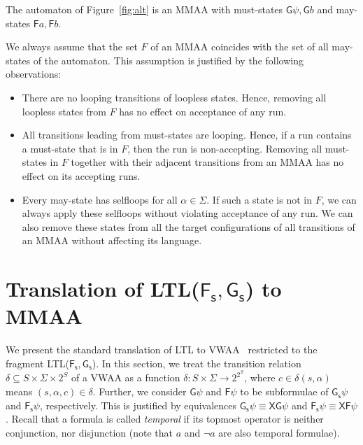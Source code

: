 \documentclass{llncs}
\newcommand{\X}{\mathsf{X}}     \newcommand{\U}{{\,\uU\,}}      \newcommand{\uU}{\mathsf{U}}    \newcommand{\rR}{\mathsf{R}}    \newcommand{\R}{{\,\rR\,}}      \newcommand{\F}{\mathsf{F}}     \newcommand{\G}{\mathsf{G}}     \newcommand{\Fs}{{\F\!\s}}      \newcommand{\Gs}{{\G\s}}        \newcommand{\s}{_\mathsf{s}}
\begin{document}
The automaton of Figure~\ref{fig:alt} is an MMAA with must-states
$\G\psi,\G b$ and may-states $\F a,\F b$.

We always assume that the set $F$ of an MMAA coincides with the set of all may-states of the automaton.  This
assumption is justified by the following observations:
\begin{itemize}
\item There are no looping transitions of loopless states. Hence,
  removing all loopless states from $F$ has no effect on acceptance of
  any run.
\item All transitions leading from must-states are looping. Hence, if a
  run contains a must-state that is in $F$, then the run is
  non-accepting.  Removing all must-states in $F$ together with their
  adjacent transitions from an MMAA has no effect on its accepting runs.
\item Every may-state has selfloops for all $\alpha\in\Sigma$. If such a
  state is not in $F$, we can always apply these selfloops without violating
  acceptance of any run. We can also remove these states from all the target
  configurations of all transitions of an MMAA without affecting its
  language.
\end{itemize}





\section{Translation of LTL($\Fs,\Gs$) to MMAA}\label{sec:corr}

We present the standard translation of LTL to VWAA~\cite{GO01} restricted to
the fragment LTL($\Fs,\Gs$).  In this section, we treat the transition
relation $\delta\subseteq S\times\Sigma\times2^S$ of a VWAA as a function
$\delta:S\times\Sigma\rightarrow2^{2^S}$, where $c\in\delta(s,\alpha)$ means
$(s,\alpha,c)\in\delta$.  Further, we consider $\G\psi$ and $\F\psi$ to be
subformulae of $\Gs\psi$ and $\Fs\psi$, respectively.  This is justified by
equivalences $\Gs\psi\equiv\X\G\psi$ and $\Fs\psi\equiv\X\F\psi$.  Recall
that a formula is called \emph{temporal} if its topmost operator is neither
conjunction, nor disjunction (note that $a$ and $\neg a$ are also temporal
formulae).
\end{document}
